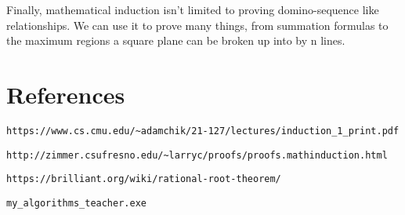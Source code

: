 \documentclass{article}
\begin{document}
\noindent
Finally, mathematical induction isn't limited to proving domino-sequence like relationships. We can use it to prove many things, from summation formulas  to the maximum regions a square plane can be broken up into by n lines.

\section{References}
\begin{verbatim}
https://www.cs.cmu.edu/~adamchik/21-127/lectures/induction_1_print.pdf
\end{verbatim}

\begin{verbatim}
http://zimmer.csufresno.edu/~larryc/proofs/proofs.mathinduction.html
\end{verbatim}

\begin{verbatim}
https://brilliant.org/wiki/rational-root-theorem/
\end{verbatim}

\begin{verbatim}
my_algorithms_teacher.exe
\end{verbatim}
\end{document}
